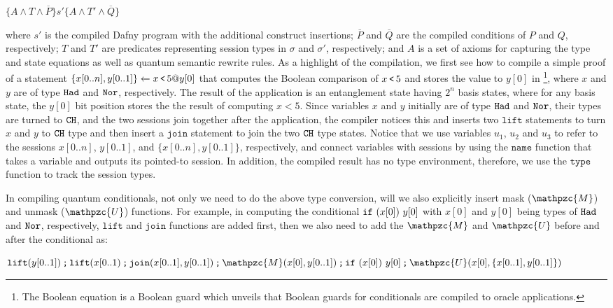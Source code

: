{\small
\begin{center}
$\{A\wedge T\wedge \overline{P}\} s' \{A\wedge T'\wedge \overline{Q}\}$
\end{center}
}

where $s'$ is the compiled Dafny program with the additional construct insertions; $\overline{P}$ and $\overline{Q}$ are the compiled conditions of $P$ and $Q$, respectively; $T$ and $T'$ are predicates representing session types in $\sigma$ and $\sigma'$, respectively; and $A$ is a set of axioms for capturing the type and state equations as well as quantum semantic rewrite rules.
As a highlight of the compilation, we first see how to compile a simple proof of a statement ${\{x[0..n],y[0..1]\}} \xleftarrow{} {x\,\texttt{<}\,5@y[0]}$ that computes the Boolean comparison of $x\,\texttt{<}\,5$ and stores the value to $y[0]$ in  \footnote{The Boolean equation is a \qafny Boolean guard which unveils that \qafny Boolean guards for conditionals are compiled to oracle applications.}, where $x$ and $y$ are of type $\texttt{Had}$ and $\texttt{Nor}$, respectively. The result of the application is an entanglement state having $2^n$ basis states, where for any basis state, the $y[0]$ bit position stores the the result of computing $x<5$.
Since variables $x$ and $y$ initially are of type $\texttt{Had}$ and $\texttt{Nor}$, their types are turned to $\texttt{CH}$, and the two sessions join together after the application, the compiler notices this and inserts two $\texttt{lift}$ statements to turn $x$ and $y$ to $\texttt{CH}$ type and then insert a $\texttt{join}$ statement to join the two $\texttt{CH}$ type states. Notice that we use variables $u_1$, $u_2$ and $u_3$ to refer to the sessions $x[0..n]$, $y[0..1]$, and $\{x[0..n],y[0..1]\}$, respectively, and connect variables with sessions by using the $\texttt{name}$ function that takes a variable and outputs its pointed-to session.
In addition, the compiled result has no type environment, therefore, we use the $\texttt{type}$ function to track the session types.

In compiling quantum conditionals, not only we need to do the above type conversion, will we also explicitly insert mask ($\mathpzc{M}$) and unmask ($\mathpzc{U}$) functions. For example, in computing the conditional $\texttt{if}~{(x[0])}~{y[0]}$ with $x[0]$ and $y[0]$ being types of $\texttt{Had}$ and $\texttt{Nor}$, respectively,  $\texttt{lift}$ and $\texttt{join}$ functions are added first, then we also need to add the $\mathpzc{M}$ and $\mathpzc{U}$ before and after the conditional as:

{\footnotesize
\begin{center}
$\sseq{\texttt{lift}(y[0..1])}{\sseq{\texttt{lift}(x[0..1)}{\sseq{\texttt{join}(x[0..1],y[0..1])}{\sseq{\sseq{\mathpzc{M}(x[0],y[0..1])}{\sifq{x[0]}{y[0]}}}{\mathpzc{U}(x[0],\{x[0..1],y[0..1]\})}}}}$
\end{center}
}


